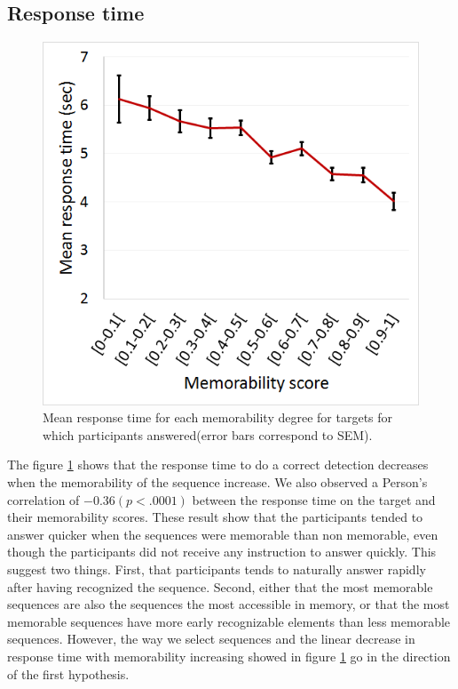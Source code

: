 \documentclass[sigconf]{acmart}
\begin{document}
\subsection{Response time}
\begin{figure}[!htbp]
	\centering
	\includegraphics[width=\columnwidth]{figures/Response_time_vs_Memorability.png}
	\caption{\label{fig:response_time_vs_memorability}Mean response time for each memorability degree for targets for which participants answered(error bars correspond to SEM).}
\end{figure}

The figure \ref{fig:response_time_vs_memorability} shows that the response time to do a correct detection decreases when the memorability of the sequence increase.
We also observed a  Person's correlation of $-0.36 (p<.0001)$ between the response time on the target and their memorability scores.
These result show that the participants tended to answer quicker when the sequences were memorable than non memorable, even though the participants did not receive any instruction to answer quickly.
This suggest two things.
First, that participants tends to naturally answer rapidly after having recognized the sequence.
Second, either that the most memorable sequences are also the sequences the most accessible in memory, or that the most memorable sequences have more early recognizable elements than less memorable sequences.
However, the way we select sequences and the linear decrease in response time with memorability increasing showed in figure \ref{fig:response_time_vs_memorability} go in the direction of the first hypothesis.
\end{document}
